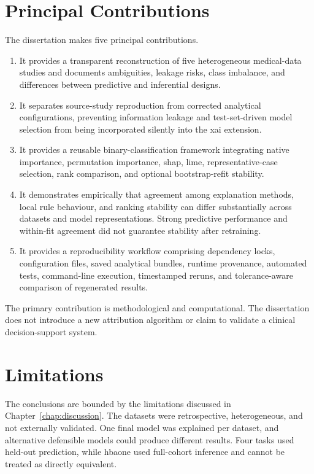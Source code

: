 \section{Principal Contributions}

The dissertation makes five principal contributions.

\begin{enumerate}
    \item It provides a transparent reconstruction of five heterogeneous medical-data studies and documents ambiguities, leakage risks, class imbalance, and differences between predictive and inferential designs.

    \item It separates source-study reproduction from corrected analytical configurations, preventing information leakage and test-set-driven model selection from being incorporated silently into the \gls{xai} extension.

    \item It provides a reusable binary-classification framework integrating native importance, permutation importance, \gls{shap}, \gls{lime}, representative-case selection, rank comparison, and optional bootstrap-refit stability.

    \item It demonstrates empirically that agreement among explanation methods, local rule behaviour, and ranking stability can differ substantially across datasets and model representations. Strong predictive performance and within-fit agreement did not guarantee stability after retraining.

    \item It provides a reproducibility workflow comprising dependency locks, configuration files, saved analytical bundles, runtime provenance, automated tests, command-line execution, timestamped reruns, and tolerance-aware comparison of regenerated results.
\end{enumerate}

The primary contribution is methodological and computational. The dissertation does not introduce a new attribution algorithm or claim to validate a clinical decision-support system.

\section{Limitations}

The conclusions are bounded by the limitations discussed in Chapter~\ref{chap:discussion}. The datasets were retrospective, heterogeneous, and not externally validated. One final model was explained per dataset, and alternative defensible models could produce different results. Four tasks used held-out prediction, while \gls{hbaone} used full-cohort inference and cannot be treated as directly equivalent.

